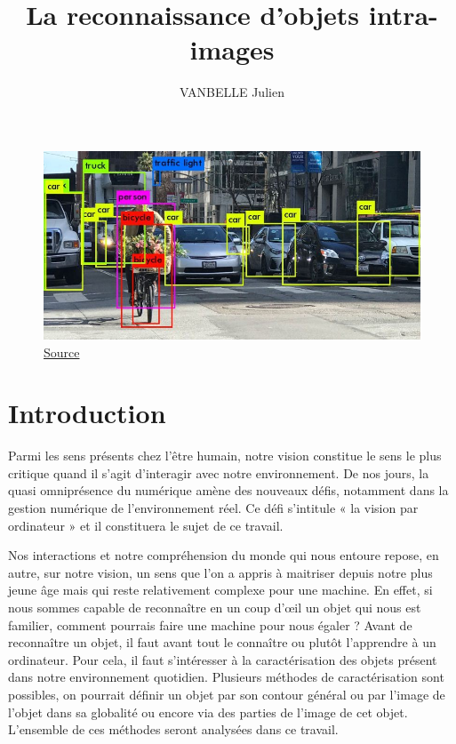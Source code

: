 \documentclass[a4paper,12pt]{article} %
\title{\textbf{La reconnaissance d'objets intra-images}} %
\author{VANBELLE Julien} %
\date{} %
\begin{document}
\maketitle %

\begin{figure}[h] %
  \centering %
  \includegraphics[scale=0.5]{illu1.jpg} %
  \caption{\href{https://www.datagenius.fr/post/reconnaissance-d-image-intelligence-artificielle-ai-compare}{Source}} %
\end{figure}
\vspace{30pt}
\tableofcontents
\newpage
\section{Introduction} %
		Parmi les sens présents chez l'être humain, notre vision constitue le sens le plus critique quand il s'agit d'interagir avec notre environnement. De nos jours, la quasi omniprésence du numérique amène des nouveaux défis, notamment dans la gestion numérique de l’environnement réel. Ce défi s’intitule « la vision par ordinateur » et il constituera le sujet de ce travail. \newline

	Nos interactions et notre compréhension du monde qui nous entoure repose, en autre, sur notre vision, un sens que l’on a appris à maitriser depuis notre plus jeune âge mais qui reste relativement complexe pour une machine. En effet, si nous sommes capable de reconnaître en un coup d’œil un objet qui nous est familier, comment pourrais faire une machine pour nous égaler ? 
Avant de reconnaître un objet, il faut avant tout le connaître ou plutôt l’apprendre à un ordinateur. Pour cela, il faut s’intéresser à la caractérisation des objets présent dans notre environnement quotidien.  Plusieurs méthodes de caractérisation sont possibles, on pourrait définir un objet par son contour général ou par l’image de l’objet dans sa globalité ou encore via des parties de l’image de cet objet. L’ensemble de ces méthodes seront analysées dans ce travail. \newline
\end{document}
